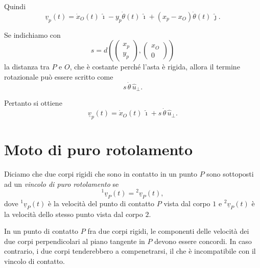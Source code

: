 \begin{examplebreak}{}
Quindi
\[
\underline{v}_p(t)
=
\dot{x}_O(t)\,\hat{\imath}
-y_p\dot{\theta}(t)\,\hat{\imath}
+(x_p-x_O)\dot{\theta}(t)\,\hat{\jmath}.
\]

Se indichiamo con
\[
s=
d\!\left(
\begin{pmatrix}
x_p\\
y_p
\end{pmatrix},
\begin{pmatrix}
x_O\\
0
\end{pmatrix}
\right)
\]
la distanza tra $P$ e $O$, che è costante perché l'asta è rigida, allora il termine rotazionale può essere scritto come
\[
s\,\dot{\theta}\,\hat{u}_\perp.
\]

Pertanto si ottiene
\[
\underline{v}_p(t)=\dot{x}_O(t)\,\hat{\imath}+s\,\dot{\theta}\,\hat{u}_\perp.
\]
\end{examplebreak}

\section{Moto di puro rotolamento}
\begin{definition}{}
Diciamo che due corpi rigidi che sono in contatto in un punto $P$ sono sottoposti ad un \emph{vincolo di puro rotolamento} se
\[
{}^{1}\underline{v}_P(t) = {}^{2}\underline{v}_P(t),
\]
dove ${}^{1}\underline{v}_P(t)$ è la velocità del punto di contatto $P$ vista dal corpo $1$ e ${}^{2}\underline{v}_P(t)$ è la velocità dello stesso punto vista dal corpo $2$.
\end{definition}

\begin{oss}{}
\begin{center}
\end{center}

In un punto di contatto $P$ fra due corpi rigidi, le componenti delle velocità dei due corpi perpendicolari al piano tangente in $P$ devono essere concordi. In caso contrario, i due corpi tenderebbero a compenetrarsi, il che è incompatibile con il vincolo di contatto.
\end{oss}

